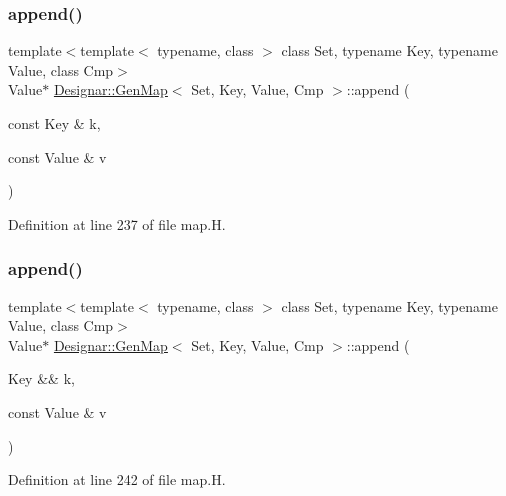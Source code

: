 \subsubsection{\texorpdfstring{append()}{append()}\hspace{0.1cm}{\footnotesize\ttfamily [1/4]}}
{\footnotesize\ttfamily template$<$template$<$ typename, class $>$ class Set, typename Key, typename Value, class Cmp$>$ \\
Value$\ast$ \hyperlink{class_designar_1_1_gen_map}{Designar\+::\+Gen\+Map}$<$ Set, Key, Value, Cmp $>$\+::append (\begin{DoxyParamCaption}\item[{const Key \&}]{k,  }\item[{const Value \&}]{v }\end{DoxyParamCaption})\hspace{0.3cm}{\ttfamily [inline]}}



Definition at line 237 of file map.\+H.

\mbox{\label{class_designar_1_1_gen_map_aeee7a9267c7c54044e7dca399658d9a7}} 
\subsubsection{\texorpdfstring{append()}{append()}\hspace{0.1cm}{\footnotesize\ttfamily [2/4]}}
{\footnotesize\ttfamily template$<$template$<$ typename, class $>$ class Set, typename Key, typename Value, class Cmp$>$ \\
Value$\ast$ \hyperlink{class_designar_1_1_gen_map}{Designar\+::\+Gen\+Map}$<$ Set, Key, Value, Cmp $>$\+::append (\begin{DoxyParamCaption}\item[{Key \&\&}]{k,  }\item[{const Value \&}]{v }\end{DoxyParamCaption})\hspace{0.3cm}{\ttfamily [inline]}}



Definition at line 242 of file map.\+H.

\mbox{\label{class_designar_1_1_gen_map_a2c148d9d32bc86315444f1026d9ef482}} 
